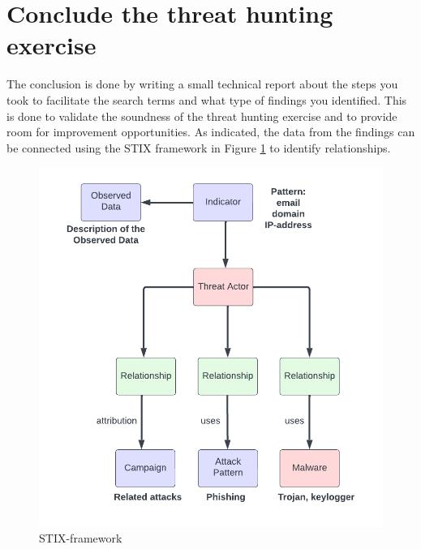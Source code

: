 \documentclass{article}
\begin{document}
	\section*{Conclude the threat hunting exercise}
	The conclusion is done by writing a small technical report about the steps you took to facilitate the search terms and what type of findings you identified. This is done to validate the soundness of the threat hunting exercise and to provide room for improvement opportunities. As indicated, the data from the findings can be connected using the STIX framework in Figure \ref{test} to identify relationships.
		
		\begin{figure}[!htb]
			\centering
			\includegraphics[width=\linewidth]{stix-test.png}
			\caption{STIX-framework}
			\label{test}
		\end{figure}
	
	
\end{document}

